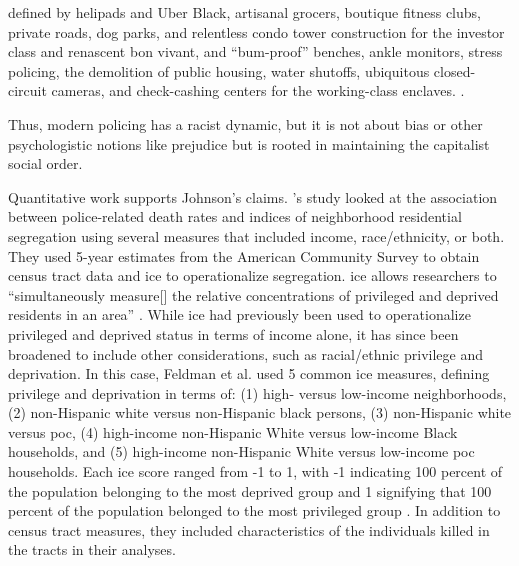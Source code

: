 \documentclass[12pt]{article}
\renewenvironment{quote}
  {\list{}{\leftmargin=\parindent\rightmargin=0pt}%
   \item\relax}
  {\endlist}
\begin{document}
\begin{quote}
defined by helipads and Uber Black, artisanal grocers, boutique fitness clubs, private roads, dog parks, and relentless condo tower construction for the investor class and renascent bon vivant, and “bum-proof” benches, ankle monitors, stress policing, the demolition of public housing, water shutoffs, ubiquitous closed-circuit cameras, and check-cashing centers for the working-class enclaves. \parencite[178]{johnsonTrumpismPolicingProblem2019}.
\end{quote}

Thus, modern policing has a racist dynamic, but it is not about bias or other psychologistic notions like prejudice but is rooted in maintaining the capitalist social order. 


Quantitative work supports Johnson’s claims. \citeauthor{feldmanPoliceRelatedDeathsNeighborhood2019}'s \parencite*{feldmanPoliceRelatedDeathsNeighborhood2019} study looked at the association between police-related death rates and indices of neighborhood residential segregation using several measures that included income, race/ethnicity, or both. They used 5-year estimates from the American Community Survey to obtain census tract data and \acrfull{ice} to operationalize segregation. \acrshort{ice} allows researchers to “simultaneously measure[] the relative concentrations of privileged and deprived residents in an area” \parencite[459]{feldmanPoliceRelatedDeathsNeighborhood2019}. While \acrshort{ice} had previously been used to operationalize privileged and deprived status in terms of income alone, it has since been broadened to include other considerations, such as racial/ethnic privilege and deprivation. In this case, Feldman et al. used 5 common \acrshort{ice} measures, defining privilege and deprivation in terms of: (1) high- versus low-income neighborhoods, (2) non-Hispanic white versus non-Hispanic black persons, (3) non-Hispanic white versus \acrfull{poc}, (4) high-income non-Hispanic White versus low-income Black households, and (5) high-income non-Hispanic White versus low-income \acrshort{poc} households. Each \acrshort{ice} score ranged from -1 to 1, with -1 indicating 100 percent of the population belonging to the most deprived group and 1 signifying that 100 percent of the population belonged to the most privileged group \parencite[459]{feldmanPoliceRelatedDeathsNeighborhood2019}. In addition to census tract measures, they included characteristics of the individuals killed in the tracts in their analyses.
\end{document}
